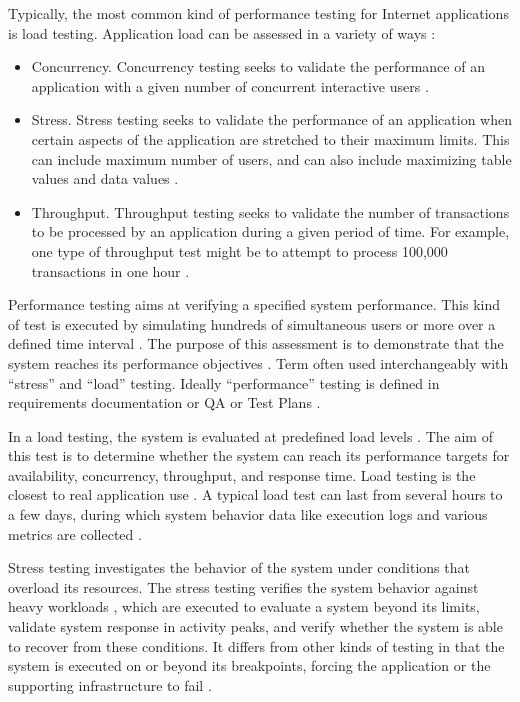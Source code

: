 \documentclass[espaco=umemeio,chapter=TITLE,twoside,openright]{abnt}
\begin{document}
Typically, the most common kind of performance testing for Internet applications is load testing. Application load can be assessed in a variety of ways \cite{Perry2004}:

\begin{itemize}
\item Concurrency. Concurrency testing seeks to validate the performance of an application with a given number of concurrent interactive users \cite{Perry2004}.
\item Stress. Stress testing seeks to validate the performance of an application when certain aspects of the application are stretched to their maximum limits. This can include maximum number of users, and can also include maximizing table values and data values \cite{Perry2004}.
\item Throughput. Throughput testing seeks to validate the number of transactions to be processed by an application during a given period of time. For example, one type of throughput test might be to attempt to process 100,000 transactions in one hour \cite{Perry2004}.
\end{itemize}


Performance testing aims at verifying a specified system performance. This kind of test is executed by simulating hundreds of simultaneous users or more over a defined time interval \cite{DiLucca2006}. The purpose of this assessment is to demonstrate that the system reaches its performance objectives \cite{Sandler2004}.  Term often used interchangeably with “stress” and “load” testing. Ideally “performance” testing is defined in requirements documentation or QA or Test Plans \cite{Lewis2005}.


In a load testing, the system is evaluated at predefined load levels \cite{DiLucca2006}. The aim of this test is to determine whether the system can reach its performance targets for availability, concurrency, throughput, and response time. Load testing is the closest to real application use \cite{Molyneaux2009}. A typical load test can last from several hours to a few days, during which system behavior data like execution logs and various metrics are collected \cite{Afzal2009a}.

Stress testing investigates the behavior of the system under conditions
that overload its resources. The stress testing verifies the system behavior against heavy workloads \cite{Sandler2004} \cite{Lewis2005}, which are executed to evaluate a system beyond its limits, validate system response in activity peaks, and verify whether the system is able to recover from these conditions. It differs from other kinds of testing in that the system is executed on or beyond its breakpoints, forcing the application or the supporting infrastructure to fail \cite{DiLucca2006} \cite{Molyneaux2009}.
\end{document}
